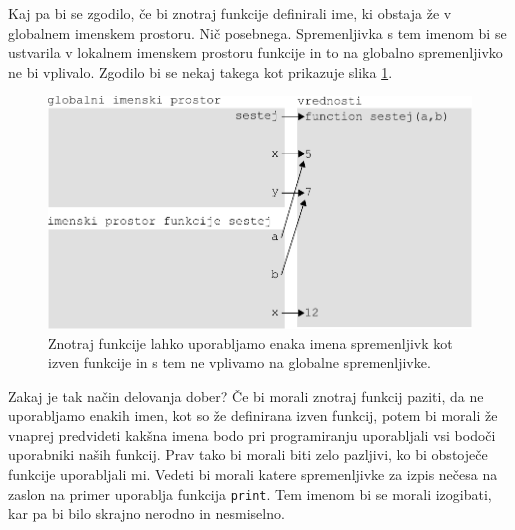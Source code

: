 Kaj pa bi se zgodilo, če bi znotraj funkcije definirali ime, ki obstaja že v globalnem imenskem prostoru. Nič posebnega. Spremenljivka s tem imenom bi se ustvarila v lokalnem imenskem prostoru funkcije in to na globalno spremenljivko ne bi vplivalo. Zgodilo bi se nekaj takega kot prikazuje slika \ref{img:imenski_prostor_5}.
\begin{figure}
    \centering
    \includegraphics[width=\linewidth]{img/imenski_prostor_5.pdf}
    \caption{Znotraj funkcije lahko uporabljamo enaka imena spremenljivk kot izven funkcije in s tem ne vplivamo na globalne spremenljivke.}
    \label{img:imenski_prostor_5}
\end{figure}

Zakaj je tak način delovanja dober? Če bi morali znotraj funkcij paziti, da ne uporabljamo enakih imen, kot so že definirana izven funkcij, potem bi morali že vnaprej predvideti kakšna imena bodo pri programiranju uporabljali vsi bodoči uporabniki naših funkcij. Prav tako bi morali biti zelo pazljivi, ko bi obstoječe funkcije uporabljali mi. Vedeti bi morali katere spremenljivke za izpis nečesa na zaslon na primer uporablja funkcija \texttt{print}. Tem imenom bi se morali izogibati, kar pa bi bilo skrajno nerodno in nesmiselno.

